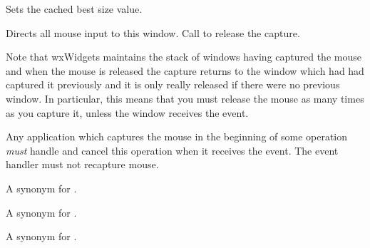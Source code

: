 
Sets the cached best size value.


\label{wxwindowcapturemouse}


Directs all mouse input to this window. Call  to
release the capture.

Note that wxWidgets maintains the stack of windows having captured the mouse
and when the mouse is released the capture returns to the window which had had
captured it previously and it is only really released if there were no previous
window. In particular, this means that you must release the mouse as many times
as you capture it, unless the window receives
the  event.

Any application which captures the mouse in the beginning of some operation
{\em must} handle 
and cancel this operation when it receives the event. The event handler must
not recapture mouse.




\label{wxwindowcenter}


A synonym for .


\label{wxwindowcenteronparent}


A synonym for .


\label{wxwindowcenteronscreen}


A synonym for .


\label{wxwindowcentre}


